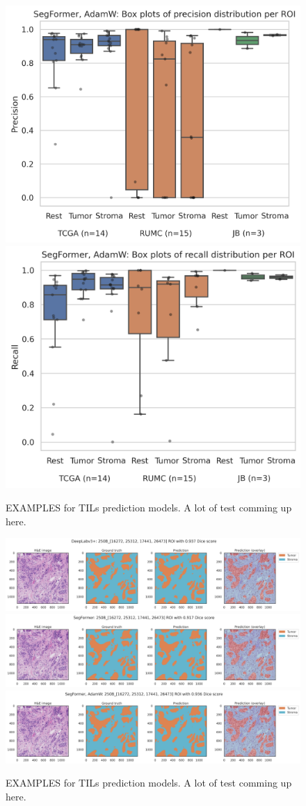 \begin{figure}
\includegraphics[width=.5\linewidth]{figures/tissue/segformer,_adamw_prec_roi_wsirois.png}
\includegraphics[width=.5\linewidth]{figures/tissue/segformer,_adamw_recall_roi_wsirois.png}

\caption{EXAMPLES for TILs prediction models. A lot of test comming up here.}
\label{fig:figure3}
\end{figure}

\begin{figure}
\includegraphics[width=\linewidth]{figures/tissue/deeplabv3+_dice_s_250B_[16272, 25312, 17441, 26473]_check.png}
\includegraphics[width=\linewidth]{figures/tissue/segformer_dice_s_250B_[16272, 25312, 17441, 26473]_check.png}
\includegraphics[width=\linewidth]{figures/tissue/segformer,_adamw_dice_s_250B_[16272, 25312, 17441, 26473]_check.png}

\caption{EXAMPLES for TILs prediction models. A lot of test comming up here.}
\label{fig:figure3}
\end{figure}

